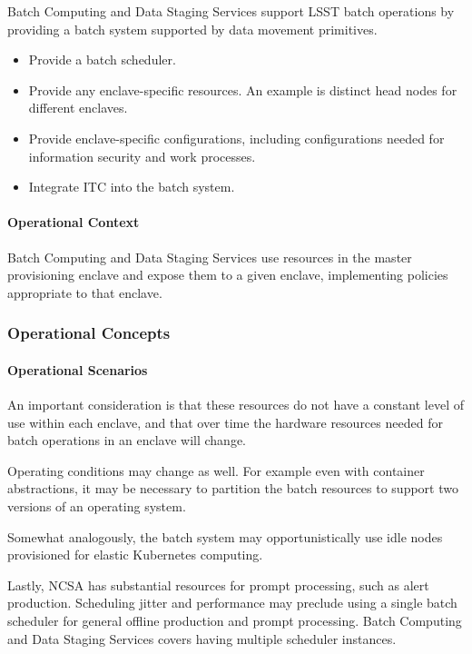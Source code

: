Batch Computing and Data Staging Services support LSST batch 
operations by providing a batch system supported by data movement primitives. 

\begin{itemize}

\item Provide a batch scheduler.

\item Provide any enclave-specific resources. An example is distinct head
nodes for different enclaves.

\item Provide enclave-specific configurations, including configurations
needed for information security and work processes.

\item Integrate ITC into the batch system.

\end{itemize}

\paragraph{Operational Context}

Batch Computing and Data Staging Services use resources in the master provisioning 
enclave and expose them to a given enclave, implementing policies appropriate to that enclave.

\subsubsection{Operational Concepts}

\paragraph{Operational Scenarios}

An important consideration is that these resources do not have a constant
level of use within each enclave, and that over time the hardware resources
needed for batch operations in an enclave will change.

Operating conditions may change as well. For example even with container
abstractions, it may be necessary to partition the batch resources to
support two versions of an operating system.

Somewhat analogously, the batch system may opportunistically use idle nodes provisioned
for elastic Kubernetes computing. 

Lastly, NCSA has substantial resources for prompt processing, such as alert
production. Scheduling jitter and performance may preclude using a single batch
scheduler for general offline production and prompt processing. Batch Computing 
and Data Staging Services covers having multiple scheduler instances.